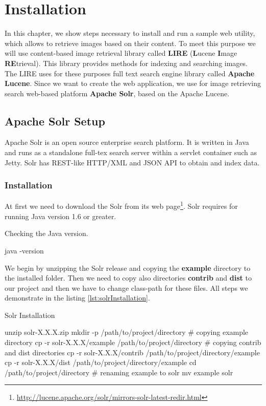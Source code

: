 \documentclass[12pt,a4paper]{report}
\begin{document}
\tableofcontents

\chapter{Installation}
\label{ch:installation}
In this chapter, we show steps necessary to install and run a sample web utility, which allows to retrieve images based on their content. To meet this purpose we will use content-based image retrieval library called \textbf{LIRE} (\textbf{L}ucene \textbf{I}mage \textbf{RE}trieval). This library provides methods for indexing and searching images. The LIRE uses for these purposes full text search engine library called \textbf{Apache Lucene}. Since we want to create the web application, we use for image retrieving search web-based platform \textbf{Apache Solr}, based on the Apache Lucene.

\section{Apache Solr Setup}
Apache Solr is an open source enterprise search platform. It is written in Java and runs as a standalone full-tex search server within a servlet container such as Jetty. Solr has REST-like HTTP/XML and JSON API to obtain and index data.\cite{solr}

\subsection{Installation}
At first we need to download the Solr from its web page\footnote{\url{http://lucene.apache.org/solr/mirrors-solr-latest-redir.html}}. Solr requires for running Java version 1.6 or greater.

\begin{listing}[H]
\caption{Checking the Java version.}
\begin{bashcode}
java -version
\end{bashcode}
\end{listing}

We begin by unzipping the Solr release and copying the \textbf{example} directory to the installed folder. Then we need to copy also directories \textbf{contrib} and \textbf{dist} to our project and then we have to change class-path for these files. All steps we demonstrate in the listing \ref{lst:solrInstallation}.

\begin{listing}[H]
\caption{Solr Installation}
\label{lst:solrInstallation}
\begin{bashcode}
unzip solr-X.X.X.zip
mkdir -p /path/to/project/directory
# copying example directory
cp -r solr-X.X.X/example /path/to/project/directory
# copying contrib and dist directories
cp -r solr-X.X.X/contrib /path/to/project/directory/example
cp -r solr-X.X.X/dist /path/to/project/directory/example
cd /path/to/project/directory
# renaming example to solr
mv example solr
\end{bashcode}
\end{listing}
\end{document}
